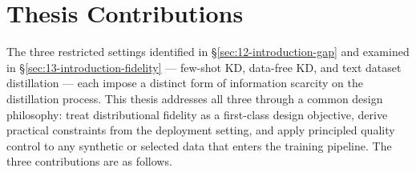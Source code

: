 \section{Thesis Contributions} \label{sec:14-introduction-contributions}

\begin{foldable}
  The three restricted settings identified in \S\ref{sec:12-introduction-gap} and examined in \S\ref{sec:13-introduction-fidelity} — few-shot \ac{KD}, data-free \ac{KD}, and text dataset distillation — each impose a distinct form of information scarcity on the distillation process.
  This thesis addresses all three through a common design philosophy: treat distributional fidelity as a first-class design objective, derive practical constraints from the deployment setting, and apply principled quality control to any synthetic or selected data that enters the training pipeline.
  The three contributions are as follows.
\end{foldable}

